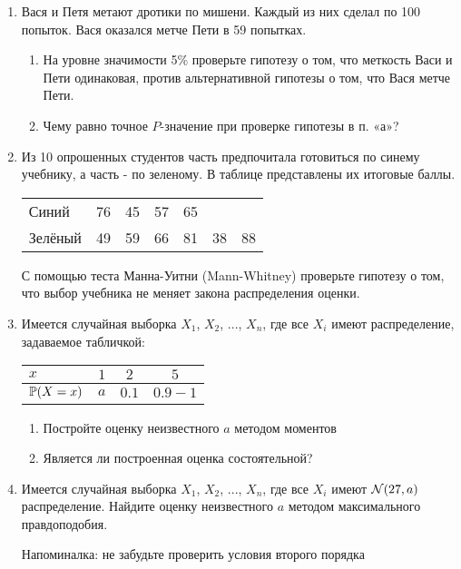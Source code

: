 \begin{enumerate}
\item Вася и Петя метают дротики по мишени. Каждый из них сделал
по 100 попыток. Вася оказался метче Пети в 59 попытках.
\begin{enumerate}
\item На уровне
значимости 5\% проверьте гипотезу о том, что меткость Васи и Пети
одинаковая, против альтернативной гипотезы о том, что Вася метче
Пети.
\item Чему равно точное $P$-значение при проверке гипотезы в п. «а»?
\end{enumerate}

\item Из 10 опрошенных студентов часть предпочитала готовиться по
синему учебнику, а часть - по зеленому. В таблице представлены их
итоговые баллы.

\begin{tabular}{@{}lcccccc@{}}
\toprule
Синий   & 76 & 45 & 57 & 65 &    &    \\
Зелёный & 49 & 59 & 66 & 81 & 38 & 88 \\ \bottomrule
\end{tabular}


С помощью теста Манна-Уитни (Mann-Whitney) проверьте гипотезу о
том, что выбор учебника не меняет закона распределения оценки.

\item Имеется случайная выборка $X_{1}$, $X_{2}$, ..., $X_{n}$, где все $X_{i}$ имеют распределение, задаваемое табличкой:

\begin{tabular}{@{}lccc@{}}
\toprule
$x$         & $1$ & $2$   & $5$     \\ \midrule
$\P(X=x)$ & $a$ & $0.1$ & $0.9-1$ \\ \bottomrule
\end{tabular}
\begin{enumerate}
\item Постройте оценку неизвестного $a$ методом моментов
\item Является ли построенная оценка состоятельной?
\end{enumerate}

\item Имеется случайная выборка $X_{1}$, $X_{2}$, ..., $X_{n}$, где все $X_{i}$ имеют $\cN(27,a)$ распределение.
Найдите оценку неизвестного $a$ методом максимального правдоподобия.

Напоминалка: не забудьте проверить условия второго порядка


\end{enumerate}
